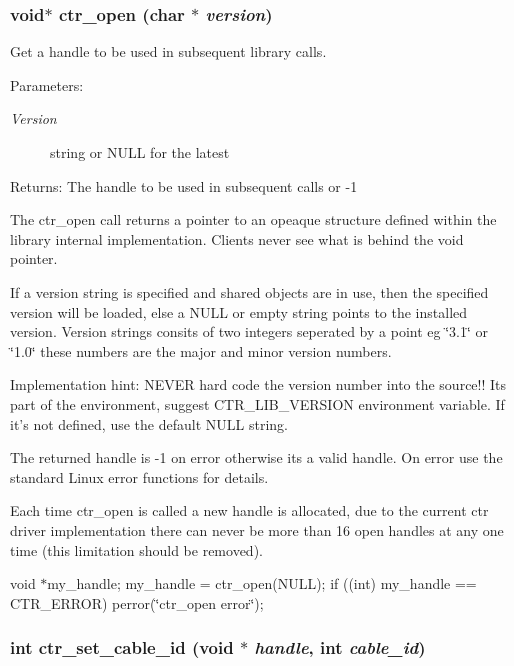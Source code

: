 \subsubsection{\setlength{\rightskip}{0pt plus 5cm}void$\ast$ ctr\_\-open (char $\ast$ {\em version})}\label{libctr_8doxygen_197688487e3b8af77e9c093c54b4493a}


Get a handle to be used in subsequent library calls. 

\begin{Desc}
\item[Parameters:]
\begin{description}
\item[{\em Version}]string or NULL for the latest \end{description}
\end{Desc}
\begin{Desc}
\item[Returns:]The handle to be used in subsequent calls or -1\end{Desc}
The ctr\_\-open call returns a pointer to an opeaque structure defined within the library internal implementation. Clients never see what is behind the void pointer.

If a version string is specified and shared objects are in use, then the specified version will be loaded, else a NULL or empty string points to the installed version. Version strings consits of two integers seperated by a point eg \char`\"{}3.1\char`\"{} or \char`\"{}1.0\char`\"{} these numbers are the major and minor version numbers.

Implementation hint: NEVER hard code the version number into the source!! Its part of the environment, suggest CTR\_\-LIB\_\-VERSION environment variable. If it's not defined, use the default NULL string.

The returned handle is -1 on error otherwise its a valid handle. On error use the standard Linux error functions for details.

Each time ctr\_\-open is called a new handle is allocated, due to the current ctr driver implementation there can never be more than 16 open handles at any one time (this limitation should be removed).

void $\ast$my\_\-handle; my\_\-handle = ctr\_\-open(NULL); if ((int) my\_\-handle == CTR\_\-ERROR) perror(\char`\"{}ctr\_\-open error\char`\"{}); 
\subsubsection{\setlength{\rightskip}{0pt plus 5cm}int ctr\_\-set\_\-cable\_\-id (void $\ast$ {\em handle}, int {\em cable\_\-id})}\label{libctr_8doxygen_e71aba318309d65baa91e59e8825388b}


